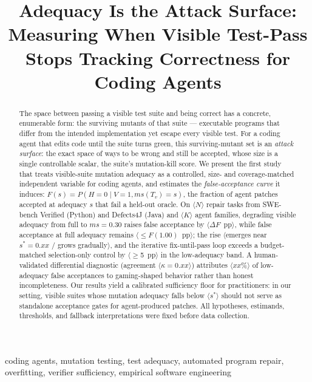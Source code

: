 \documentclass[conference]{IEEEtran}
\newcommand{\PH}[1]{\colorbox{gray!18}{\small$\langle$#1$\rangle$}}
\newcommand{\ms}{\ensuremath{\mathit{ms}}}
\newcommand{\Fs}{\ensuremath{F(s)}}
\begin{document}
\title{Adequacy Is the Attack Surface: Measuring When Visible Test-Pass
Stops Tracking Correctness for Coding Agents}

\author{
}

\maketitle

\begin{abstract}
The space between passing a visible test suite and being correct has a
concrete, enumerable form: the surviving mutants of that suite --- executable
programs that differ from the intended implementation yet escape every
visible test. For a coding agent that edits code until the suite turns
green, this surviving-mutant set is an \emph{attack surface}: the exact
space of ways to be wrong and still be accepted, whose size is a single
controllable scalar, the suite's mutation-kill score. We present the first
study that treats visible-suite mutation adequacy as a controlled,
size- and coverage-matched independent variable for coding agents, and
estimates the \emph{false-acceptance curve} it induces:
$\Fs = P(H{=}0 \mid V{=}1, \ms(T_v){=}s)$, the fraction of
agent patches accepted at adequacy $s$ that fail a held-out oracle.
On \PH{$N$} repair tasks from SWE-bench Verified (Python) and Defects4J
(Java) and \PH{$K$} agent families, degrading visible adequacy from full
to $\ms{=}0.30$ raises false acceptance by \PH{$\Delta F$~pp}, while false
acceptance at full adequacy remains \PH{$\le F(1.00)$~pp}; the rise
\PH{emerges near $s^\ast{=}0.xx$ / grows gradually}, and the iterative
fix-until-pass loop exceeds a budget-matched selection-only control by
\PH{$\ge$5~pp} in the low-adequacy band. A human-validated differential
diagnostic (agreement \PH{$\kappa{=}0.xx$}) attributes \PH{$xx\%$} of
low-adequacy false acceptances to gaming-shaped behavior rather than
honest incompleteness. Our results yield a calibrated sufficiency floor
for practitioners: in our setting, visible suites whose mutation adequacy
falls below \PH{$s^\ast$} should not serve as standalone acceptance gates
for agent-produced patches. All hypotheses, estimands, thresholds, and
fallback interpretations were fixed before data collection.
\end{abstract}

\begin{IEEEkeywords}
coding agents, mutation testing, test adequacy, automated program repair,
overfitting, verifier sufficiency, empirical software engineering
\end{IEEEkeywords}
\end{document}
